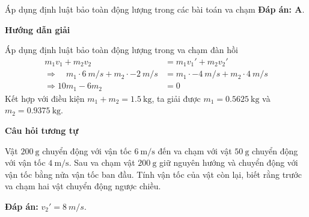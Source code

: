 \begin{dang}{Áp dụng định luật bảo toàn động lượng trong các bài toán va chạm}
{		\textbf{Đáp án: A}.
	}
	{	\begin{center}
			\textbf{Hướng dẫn giải}
		\end{center}
		
		Áp dụng định luật bảo toàn động lượng trong va chạm đàn hồi
		\begin{align*}
			m_1v_1 + m_2 v_2 &= m_1v_1' + m_2 v_2'\\ \Rightarrow\quad m_1\cdot\SI{6}{m/s} + m_2 \cdot \SI{-2}{m/s} &= m_1 \cdot \SI{-4}{m/s} + m_2 \cdot \SI{4}{m/s}\\
			\Rightarrow 10m_1-6m_2&=0
		\end{align*}
		Kết hợp với điều kiện $m_1+m_2=\SI{1.5}{\kilogram}$, ta giải được $m_1=\SI{0.5625}{\kilogram}$ và $m_2=\SI{0,9375}{\kilogram}$.
		
		
		\begin{center}
			\textbf{Câu hỏi tương tự}
		\end{center}
		
		Vật $\SI{200}{\gram}$ chuyển động với vận tốc $\SI{6}{\meter/\second}$ đến va chạm với vật $\SI{50}{\gram}$ chuyển động với vận tốc $\SI{4}{\meter/\second}$. Sau va chạm vật $\SI{200}{\gram}$ giữ nguyên hướng và chuyển động với vận tốc bằng nửa vận tốc ban đầu. Tính vận tốc của vật còn lại, biết rằng trước va chạm hai vật chuyển động ngược chiều.
		
		\textbf{Đáp án:} $v_2'=\SI{8}{m/s}$.
		
		
	}
\end{dang}


